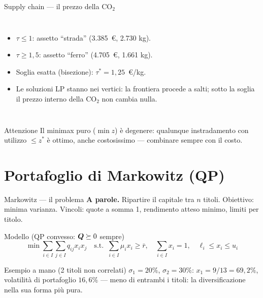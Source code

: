 \documentclass[11pt,aspectratio=169]{beamer}
\begin{document}
\begin{frame}{Supply chain --- il prezzo della CO$_2$}
\begin{columns}
\small
\begin{itemize}
  \item $\tau \le 1$: assetto ``strada'' (3.385~\euro, 2.730 kg).
  \item $\tau \ge 1{,}5$: assetto ``ferro'' (4.705~\euro, 1.661 kg).
  \item Soglia esatta (bisezione): $\tau^* = 1{,}25$~\euro/kg.
  \item Le soluzioni LP stanno nei \alert{vertici}: la frontiera procede a salti;
        sotto la soglia il prezzo interno della CO$_2$ non cambia nulla.
\end{itemize}
\end{columns}
\begin{block}{Attenzione}
Il minimax puro ($\min z$) è degenere: qualunque instradamento con utilizzo
$\le z^*$ è ottimo, anche costosissimo --- combinare sempre con il costo.
\end{block}
\end{frame}

\section{Portafoglio di Markowitz (QP)}

\begin{frame}{Markowitz --- il problema}
\textbf{A parole.} Ripartire il capitale tra $n$ titoli. Obiettivo: minima varianza.
Vincoli: quote a somma 1, rendimento atteso minimo, limiti per titolo.
\begin{block}{Modello (QP convesso: $\boldsymbol{Q} \succeq 0$ sempre)}
\vspace{-2ex}
\[
\min \sum_{i \in I}\sum_{j \in I} q_{ij} x_i x_j \quad
\text{s.t.}\;\; \sum_{i \in I} \mu_i x_i \ge \bar r,\quad
\sum_{i \in I} x_i = 1,\quad \ell_i \le x_i \le u_i
\]
\end{block}
\begin{block}{Esempio a mano (2 titoli non correlati)}
$\sigma_1 = 20\%$, $\sigma_2 = 30\%$: $x_1 = 9/13 = 69{,}2\%$, volatilità di
portafoglio $16{,}6\%$ --- \alert{meno di entrambi i titoli}: la diversificazione
nella sua forma più pura.
\end{block}
\end{frame}
\end{document}
